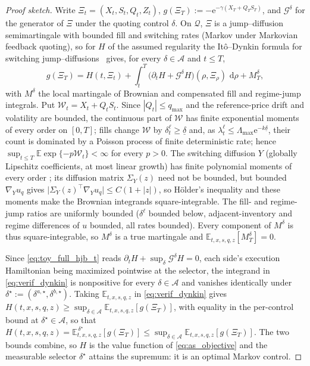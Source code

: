 \documentclass[11pt,a4paper]{article}
\newcommand{\E}{\mathbb{E}}
\newcommand{\Qcal}{\mathcal{Q}}
\newcommand{\Acal}{\mathcal{A}}
\newcommand{\dd}{\,\mathrm{d}}
\newcommand{\e}{\mathrm e}
\theoremstyle{plain}
\theoremstyle{definition}
\begin{document}
\begin{proof}[Proof sketch]
Write \(\Xi_t=(X_t,S_t,Q_t,Z_t)\), \(g(\Xi_T):=-\e^{-\gamma(X_T+Q_TS_T)}\), and
\(\mathcal G^\delta\) for the generator of \(\Xi\) under the quoting control
\(\delta\).  On \(\Qcal\), \(\Xi\) is a jump--diffusion semimartingale with
bounded fill and switching rates (Markov under Markovian feedback quoting), so
for \(H\) of the assumed regularity the It\^o--Dynkin formula for switching
jump--diffusions~\cite{YinZhu2010} gives, for every \(\delta\in\Acal\) and \(t\le T\),
\begin{equation}
g(\Xi_T)=H(t,\Xi_t)
+\int_t^T\bigl(\partial_tH+\mathcal G^{\delta}H\bigr)(\rho,\Xi_\rho)\,\dd\rho
+M_T^\delta,
\label{eq:verif_dynkin}
\end{equation}
with \(M^\delta\) the local martingale of Brownian and compensated fill and
regime-jump integrals.  Put \(\mathcal W_t=X_t+Q_tS_t\).  Since
\(|Q_t|\le q_{\max}\) and the reference-price drift and volatility are bounded,
the continuous part of \(\mathcal W\) has finite exponential moments of every
order on \([0,T]\); fills change \(\mathcal W\) by
\(\delta_t^\ell\ge\underline\delta\) and, as
\(\lambda_t^\ell\le\Lambda_{\max}\e^{-k\underline\delta}\), their count is
dominated by a Poisson process of finite deterministic rate; hence
\(\sup_{t\le T}\E\exp\{-p\mathcal W_t\}<\infty\) for every \(p>0\).  The
switching diffusion \(Y\) (globally Lipschitz coefficients, at most linear
growth) has finite polynomial moments of every order
\cite{Pham2009,YinZhu2010}; its
diffusion matrix \(\Sigma_Y(z)\) need not be bounded, but bounded
\(\nabla_Yu_q\) gives
\(\lvert\Sigma_Y(z)^\top\nabla_Yu_q\rvert\le C(1+\lvert z\rvert)\), so Hölder's
inequality and these moments make the Brownian integrands square-integrable.
The fill- and regime-jump ratios are uniformly bounded (\(\delta^\ell\) bounded
below, adjacent-inventory and regime differences of \(u\) bounded, all rates
bounded).  Every component of \(M^\delta\) is thus square-integrable, so
\(M^\delta\) is a true martingale and \(\E_{t,x,s,q,z}[M_T^\delta]=0\).

Since \eqref{eq:toy_full_hjb_t} reads
\(\partial_tH+\sup_{\delta}\mathcal G^{\delta}H=0\), each side's execution
Hamiltonian being maximized pointwise at the selector, the integrand in
\eqref{eq:verif_dynkin} is nonpositive for every \(\delta\in\Acal\) and
vanishes identically under
\(\delta^\star:=(\delta^{a,\star},\delta^{b,\star})\).  Taking
\(\E_{t,x,s,q,z}\) in \eqref{eq:verif_dynkin} gives
\(H(t,x,s,q,z)\ge\sup_{\delta\in\Acal}\E_{t,x,s,q,z}[g(\Xi_T)]\), with equality
in the per-control bound at \(\delta^\star\in\Acal\), so that
\(H(t,x,s,q,z)=\E^{\,\delta^\star}_{t,x,s,q,z}[g(\Xi_T)]
\le\sup_{\delta\in\Acal}\E_{t,x,s,q,z}[g(\Xi_T)]\).  The two bounds combine,
so \(H\) is the value function of \eqref{eq:as_objective} and the measurable
selector \(\delta^\star\) attains the supremum: it is an optimal Markov
control.
\end{proof}
\end{document}
